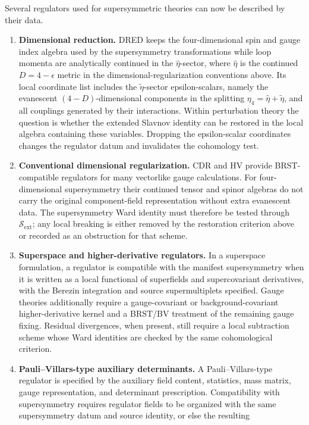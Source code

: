 Several regulators used for supersymmetric theories can now be described by
their data.

\begin{enumerate}
\item \textbf{Dimensional reduction.}  DRED keeps the four-dimensional spin
and gauge index algebra used by the supersymmetry transformations while loop
momenta are analytically continued in the \(\hat\eta\)-sector, where
\(\hat\eta\) is the continued \(D=4-\epsilon\) metric in the
dimensional-regularization conventions above.  Its local coordinate list
includes the \(\tilde\eta\)-sector epsilon-scalars, namely the evanescent
\((4-D)\)-dimensional components in the splitting
\(\eta_4=\hat\eta+\tilde\eta\), and all
couplings generated by their interactions.  Within perturbation theory the
question is whether the extended Slavnov identity can be restored in the
local algebra containing these variables.  Dropping the epsilon-scalar
coordinates changes the regulator datum and invalidates the cohomology test.
\item \textbf{Conventional dimensional regularization.}  CDR and HV provide
BRST-compatible regulators for many vectorlike gauge calculations.
For four-dimensional supersymmetry their continued tensor and spinor algebras
do not carry the original component-field representation without extra
evanescent data.  The supersymmetry Ward identity must therefore be tested
through \(\mathcal S_{\mathrm{ext}}\); any local breaking is either removed by
the restoration criterion above or recorded as an obstruction for that scheme.
\item \textbf{Superspace and higher-derivative regulators.}  In a superspace
formulation, a regulator is compatible with the manifest supersymmetry when
it is written as a local functional of superfields and supercovariant
derivatives, with the Berezin integration and source supermultiplets specified.
Gauge theories additionally require a gauge-covariant or background-covariant
higher-derivative kernel and a BRST/BV treatment of the remaining gauge
fixing.  Residual divergences, when present, still require a local subtraction
scheme whose Ward identities are checked by the same cohomological criterion.
\item \textbf{Pauli--Villars-type auxiliary determinants.}  A
Pauli--Villars-type regulator is specified by the auxiliary field content,
statistics, mass matrix, gauge representation, and determinant prescription.
Compatibility with supersymmetry requires regulator fields to be organized
with the same supersymmetry datum and source identity, or else the resulting

\end{enumerate}
